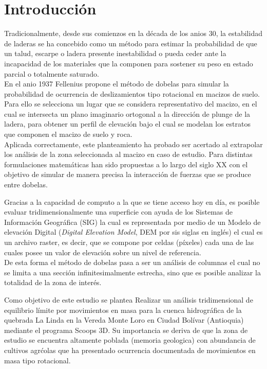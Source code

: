 \chapter{Introducci\'{o}n}
Tradicionalmente, desde sus comienzos en la d\'ecada de los anios 30, la estabilidad de laderas se ha concebido como un m\'etodo para estimar la probabilidad de que un talud, escarpe o ladera presente inestabilidad o pueda ceder ante la incapacidad de los materiales que la componen para sostener su peso en estado parcial o totalmente saturado.\\

En el anio 1937 Fellenius propone el m\'etodo de dobelas para simular la probabilidad de ocurrencia de deslizamientos tipo rotacional en macizos de suelo. Para ello se selecciona un lugar que se considera representativo del macizo, en el cual se intersecta un plano imaginario ortogonal a la direcci\'on de plunge de la ladera, para obtener un perfil de elevaci\'on bajo el cual se modelan los estratos que componen el macizo de suelo y roca.\\

Aplicada correctamente, este planteamiento ha probado ser acertado al extrapolar los an\'alisis de la zona seleccionada al macizo en caso de estudio. Para distintas formulaciones matem\'aticas han sido propuestas a lo largo del siglo XX con el objetivo de simular de manera precisa la interacci\'on de fuerzas que se produce entre dobelas.

Gracias a la capacidad de computo a la que se tiene acceso hoy en d\'ia, es posible evaluar tridimensionalmente una superficie con ayuda de los Sistemas de Informaci\'on Geogr\'afica (SIG) la cual es representada por medio de un Modelo de elevaci\'on Digital (\textit{Digital Elevation Model}, DEM por sis siglas en ingl\'es) el cual es un archivo raster, es decir, que se compone por celdas (p\'ixeles) cada una de las cuales posee un valor de elevaci\'on sobre un nivel de referencia.
\\
De esta forma el m\'etodo de dobelas pasa a ser un an\'alisis de columnas el cual no se limita a una secci\'on infinitesimalmente estrecha, sino que es posible analizar la totalidad de la zona de inter\'es.\par

Como objetivo de este estudio se plantea Realizar un an\'alisis tridimensional de equilibrio l\'imite por movimientos en masa para la cuenca hidrogr\'afica de la quebrada La Linda en la Vereda Monte Loro en Ciudad Bol\'ivar (Antioquia) mediante el programa Scoops 3D.
Su importancia se deriva de que la zona de estudio se encuentra altamente poblada (memoria geologica) con abundancia de cultivos agr\'colas que ha presentado ocurrencia documentada de movimientos en masa tipo rotacional.\\

